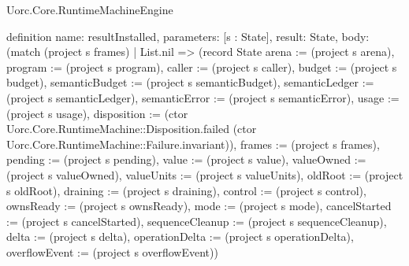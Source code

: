 \begin{lexlean}{Uorc.Core.RuntimeMachineEngine}
\begin{semanticmodule}
definition{
  name: resultInstalled,
  parameters: [s : State],
  result: State,
  body: (match (project s frames)
    | List.nil => (record State {arena := (project s arena), program := (project s program), caller := (project s caller), budget := (project s budget), semanticBudget := (project s semanticBudget), semanticLedger := (project s semanticLedger), semanticError := (project s semanticError), usage := (project s usage), disposition := (ctor Uorc.Core.RuntimeMachine::Disposition.failed (ctor Uorc.Core.RuntimeMachine::Failure.invariant)), frames := (project s frames), pending := (project s pending), value := (project s value), valueOwned := (project s valueOwned), valueUnits := (project s valueUnits), oldRoot := (project s oldRoot), draining := (project s draining), control := (project s control), ownsReady := (project s ownsReady), mode := (project s mode), cancelStarted := (project s cancelStarted), sequenceCleanup := (project s sequenceCleanup), delta := (project s delta), operationDelta := (project s operationDelta), overflowEvent := (project s overflowEvent)})
}
\end{semanticmodule}
\end{lexlean}
